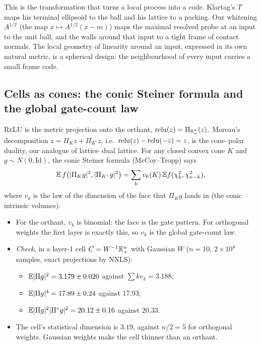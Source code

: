 This is the transformation that turns a local process into a code. Klartag's $T$ maps his terminal ellipsoid to the ball and his
lattice to a packing. Our whitening $A^{1/2}$ (the map $x\mapsto A^{1/2}(x-m)$) maps the maximal resolved probe at an input to the unit ball, and the walls around that
input to a tight frame of contact normals. The local geometry of linearity around an input, expressed in its own natural metric, is a
spherical design: the neighbourhood of every input carries a small frame code.

\subsection{Cells as cones: the conic Steiner formula and the global gate-count law}
\textsc{ReLU} is the metric projection onto the orthant, $\operatorname{relu}(z)=\Pi_{\mathbb R^n_+}(z)$. Moreau's decomposition $z=\Pi_K z+\Pi_{K^\circ}z$, i.e.\
$\operatorname{relu}(z)-\operatorname{relu}(-z)=z$, is the cone--polar duality, our analogue of lattice--dual lattice. For any closed convex cone $K$ and
$g\sim N(0,\mathrm{Id})$, the conic Steiner formula (McCoy--Tropp) says
\[
\mathbb E\,f\big(|\Pi_Kg|^2,|\Pi_{K^\circ}g|^2\big)=\sum_kv_k(K)\,\mathbb E f(\chi^2_k,\chi^2_{n-k}),
\]
where $v_k$ is the law of the dimension of the face that $\Pi_Kg$ lands in (the conic intrinsic volumes).
\begin{itemize}[leftmargin=*]
\item For the orthant, $v_k$ is binomial: the face is the gate pattern. For orthogonal weights the first layer is exactly this, so
$v_k$ is the global gate-count law.
\item \emph{Check}, in a layer-1 cell $C=W^{-1}\mathbb R^n_+$ with Gaussian $W$ ($n=10$, $2\times10^4$ samples, exact projections by NNLS):
\begin{itemize}
\item $\mathbb E|\Pi g|^2=3.179\pm0.020$ against $\sum kv_k=3.188$;
\item $\mathbb E|\Pi g|^4=17.89\pm0.24$ against $17.93$;
\item $\mathbb E|\Pi g|^2|\Pi^\circ g|^2=20.12\pm0.16$ against $20.33$.
\end{itemize}
\item The cell's statistical dimension is $3.19$, against $n/2=5$ for orthogonal weights. Gaussian weights make the cell thinner than an
orthant.
\end{itemize}

